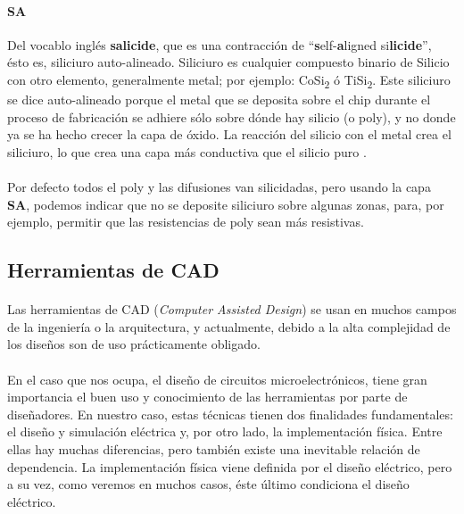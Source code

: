 \paragraph{SA}
Del vocablo inglés \textbf{salicide}, que es una contracción de ``\textbf{s}elf-\textbf{a}ligned si\textbf{licide}'',
ésto es, siliciuro auto-alineado. Siliciuro es cualquier compuesto binario de
Silicio con otro elemento, generalmente metal; por ejemplo: CoSi\textsubscript{2}
ó TiSi\textsubscript{2}. Este siliciuro se dice auto-alineado porque el metal que
se deposita sobre el chip durante el proceso de fabricación se adhiere sólo sobre
dónde hay silicio (o poly), y no donde ya se ha hecho crecer la capa de óxido.
La reacción del silicio con el metal crea el siliciuro, lo que crea una capa más
conductiva que el silicio puro \cite{Maex:silicides}.

\paragraph{}
Por defecto todos el poly y las difusiones van silicidadas, pero usando la capa \textbf{SA},
podemos indicar que no se deposite siliciuro sobre algunas zonas, para, por ejemplo,
permitir que las resistencias de poly sean más resistivas.

\subsection{Herramientas de CAD}

\paragraph{}
Las herramientas de CAD (\textit{Computer Assisted Design}) se usan
en muchos campos de la ingeniería o la arquitectura, y actualmente, debido a la alta
complejidad de los diseños son de uso prácticamente obligado.

\paragraph{}
En el caso que nos ocupa, el diseño de circuitos microelectrónicos,
tiene gran importancia el buen uso y conocimiento de las herramientas por parte de
diseñadores. En nuestro caso, estas técnicas tienen dos finalidades fundamentales:
el diseño y simulación eléctrica y, por otro lado, la implementación física. Entre ellas
hay muchas diferencias, pero también existe una inevitable relación de dependencia.
La implementación física viene definida por el diseño eléctrico, pero a su vez, como
veremos en muchos casos, éste último condiciona el diseño eléctrico.

